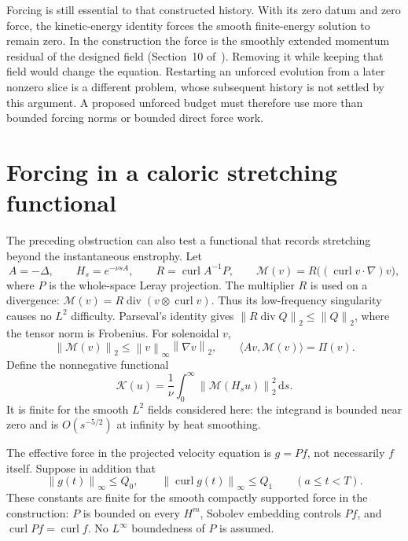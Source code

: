 \documentclass[11pt]{article}
\newcommand{\dd}{\,\mathrm d}
\newcommand{\norm}[1]{\left\lVert#1\right\rVert}
\newcommand{\curl}{\operatorname{curl}}
\begin{document}
Forcing is still essential to that constructed history. With its zero
datum and zero force, the kinetic-energy identity forces the smooth
finite-energy solution to remain zero. In the construction the force
is the smoothly extended momentum residual of the designed field
(Section~10 of~\cite{OAI}). Removing it while keeping that field would
change the equation. Restarting an unforced evolution from a later
nonzero slice is a different problem, whose subsequent history is not
settled by this argument. A proposed unforced budget must therefore
use more than bounded forcing norms or bounded direct force work.

\section{Forcing in a caloric stretching functional}

The preceding obstruction can also test a functional that records
stretching beyond the instantaneous enstrophy. Let
\[
 A=-\Delta,\qquad H_s=e^{-\nu sA},\qquad
 R=\curl A^{-1}P,\qquad
 \mathcal M(v)=R\bigl((\curl v\cdot\nabla)v\bigr),
\]
where $P$ is the whole-space Leray projection. The multiplier $R$ is
used on a divergence: $\mathcal M(v)=R\operatorname{div}(v\otimes\curl v)$.
Thus its low-frequency singularity causes no $L^2$ difficulty. Parseval's
identity gives $\norm{R\operatorname{div}Q}_2\leq\norm Q_2$, where the
tensor norm is Frobenius. For solenoidal $v$,
\begin{equation}\label{eq:Mbound}
 \norm{\mathcal M(v)}_2\leq\norm v_\infty\norm{\nabla v}_2,
 \qquad \langle Av,\mathcal M(v)\rangle=\Pi(v).
\end{equation}
Define the nonnegative functional
\begin{equation}\label{eq:Kdef}
 \mathcal K(u)=\frac1\nu\int_0^\infty
                  \norm{\mathcal M(H_su)}_2^2\dd s.
\end{equation}
It is finite for the smooth $L^2$ fields considered here: the integrand
is bounded near zero and is $O(s^{-5/2})$ at infinity by heat smoothing.

The effective force in the projected velocity equation is $g=Pf$, not
necessarily $f$ itself. Suppose in addition that
\[
 \norm{g(t)}_\infty\leq Q_0,\qquad
 \norm{\curl g(t)}_\infty\leq Q_1\qquad(a\leq t<T).
\]
These constants are finite for the smooth compactly supported force in
the construction: $P$ is bounded on every $H^m$, Sobolev embedding controls
$Pf$, and $\curl Pf=\curl f$. No $L^\infty$ boundedness of $P$ is assumed.
\end{document}
